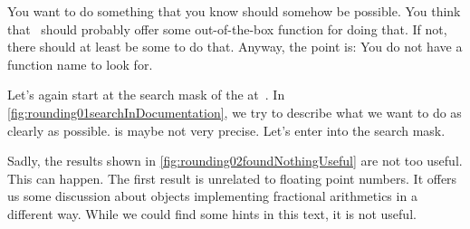 You want to do something that you know should somehow be possible.
You think that \python\ should probably offer some out-of-the-box function for doing that.
If not, there should at least be some  to do that.
Anyway, the point is:
You do not have a function name to look for.

Let's again start at the search mask of the  at~.
In \cref{fig:rounding01searchInDocumentation}, we try to describe what we want to do as clearly as possible.
 is maybe not very precise.
Let's enter  into the search mask.

Sadly, the results shown in \cref{fig:rounding02foundNothingUseful} are not too useful.
This can happen.
The first result is unrelated to floating point numbers.
It offers us some discussion about objects implementing fractional arithmetics in a different way.
While we could find some hints in this text, it is not useful.


